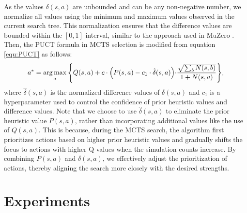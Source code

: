 As the values $\delta(s,a)$ are unbounded and can be any non-negative number, we normalize all values using the minimum and maximum values observed in the current search tree.
This normalization ensures that the difference values are bounded within the $[0, 1]$ interval, similar to the approach used in MuZero \citep{schrittwieser_mastering_2020}.
Then, the PUCT formula in MCTS selection is modified from equation \ref{equ:PUCT} as follows:
\begin{equation}
\label{equ:SE-PUCT}
    {a^*} = \mathop{\arg\max}_{a} \Bigg\{Q(s,a)+c\cdot\Bigl(P(s,a)-c_1\cdot\hat{\delta}(s,a)\Bigl)\cdot\frac {\sqrt{\sum_{b}{N(s,b)}}}{1+N(s,a)}\Bigg\},
\end{equation}
where $\hat{\delta}(s,a)$ is the normalized difference values of $\delta(s,a)$ and $c_1$ is a hyperparameter used to control the confidence of prior heuristic values and difference values.
Note that we choose to use $\hat{\delta}(s,a)$ to eliminate the prior heuristic value $P(s,a)$, rather than incorporating additional values like the use of $Q(s,a)$.
This is because, during the MCTS search, the algorithm first prioritizes actions based on higher prior heuristic values and gradually shifts the focus to actions with higher Q-values when the simulation counts increase.
By combining $P(s,a)$ and $\hat{\delta}(s,a)$, we effectively adjust the prioritization of actions, thereby aligning the search more closely with the desired strengths.


\section{Experiments}
\label{sec:experiments}

